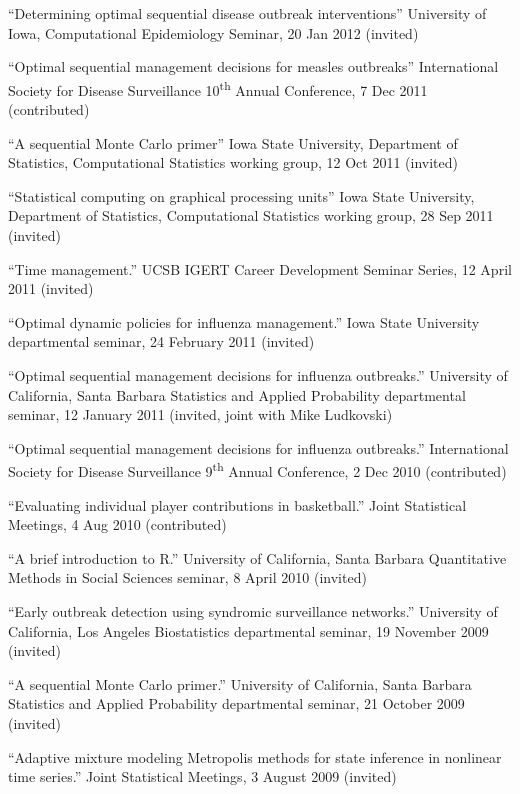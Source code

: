 \documentclass[overlapped,line]{res}
\begin{document}
\begin{resume}
{``Determining optimal sequential disease outbreak interventions'' University of Iowa, Computational Epidemiology Seminar, 20 Jan 2012 (invited)

``Optimal sequential management decisions for measles outbreaks'' International Society for Disease Surveillance 10\textsuperscript{th} Annual Conference, 7 Dec 2011 (contributed)



``A sequential Monte Carlo primer'' Iowa State University, Department of Statistics, Computational Statistics working group, 12 Oct 2011 (invited)


``Statistical computing on graphical processing units'' Iowa State University, Department of Statistics, Computational Statistics working group, 28 Sep 2011 (invited)

``Time management.'' UCSB IGERT Career Development Seminar Series, 12 April 2011 (invited)



``Optimal dynamic policies for influenza management.'' Iowa State University departmental seminar, 24 February 2011 (invited)

``Optimal sequential management decisions for influenza outbreaks.'' University of California, Santa Barbara Statistics and Applied Probability departmental seminar, 12 January 2011 (invited, joint with Mike Ludkovski)

``Optimal sequential management decisions for influenza outbreaks.'' International Society for Disease Surveillance 9\textsuperscript{th} Annual Conference, 2 Dec 2010 (contributed)


``Evaluating individual player contributions in basketball.'' Joint Statistical Meetings, 4 Aug 2010 (contributed)

``A brief introduction to R.'' University of California, Santa Barbara Quantitative Methods in Social Sciences seminar, 8 April 2010 (invited)

``Early outbreak detection using syndromic surveillance networks.'' University of California, Los Angeles Biostatistics departmental seminar, 19 November 2009 (invited)

``A sequential Monte Carlo primer.'' University of California, Santa Barbara Statistics and Applied Probability departmental seminar, 21 October 2009 (invited)

``Adaptive mixture modeling Metropolis methods for state inference in nonlinear time series.'' Joint Statistical Meetings, 3 August 2009 (invited)

}
\end{resume}
\end{document}
